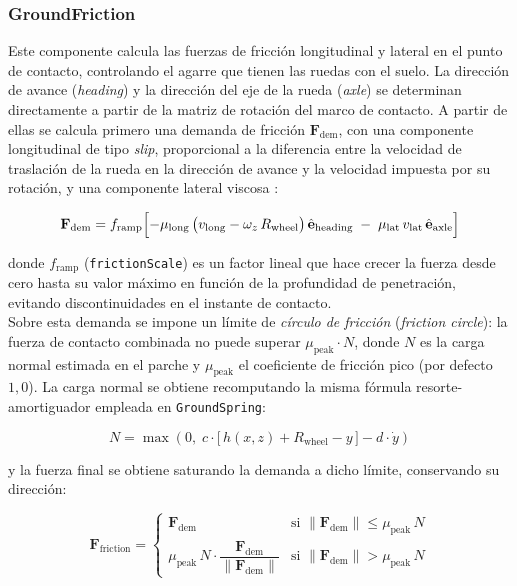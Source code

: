 \subsubsection{GroundFriction}

Este componente calcula las fuerzas de fricción longitudinal y lateral en el punto de contacto, controlando el agarre que tienen las ruedas con el suelo. La dirección de avance (\textit{heading}) y la dirección del eje de la rueda (\textit{axle}) se determinan directamente a partir de la matriz de rotación del marco de contacto. A partir de ellas se calcula primero una demanda de fricción $\mathbf{F}_\text{dem}$, con una componente longitudinal de tipo \textit{slip}, proporcional a la diferencia entre la velocidad de traslación de la rueda en la dirección de avance y la velocidad  impuesta por su rotación, y una componente lateral viscosa :

\begin{equation}
    \mathbf{F}_\text{dem} = f_\text{ramp} \Bigl[ -\mu_\text{long}\,\bigl(v_\text{long} - \omega_z\, R_\text{wheel}\bigr)\, \hat{\mathbf{e}}_\text{heading} \;-\; \mu_\text{lat}\, v_\text{lat}\, \hat{\mathbf{e}}_\text{axle} \Bigr]
\end{equation}

donde $f_\text{ramp}$ (\verb|frictionScale|) es un factor lineal que hace crecer la fuerza desde cero hasta su valor máximo en función de la profundidad de penetración, evitando discontinuidades en el instante de contacto.\\

Sobre esta demanda se impone un límite de \textit{círculo de fricción} (\textit{friction circle}): la fuerza de contacto combinada no puede superar $\mu_\text{peak} \cdot N$, donde $N$ es la carga normal estimada en el parche y $\mu_\text{peak}$ el coeficiente de fricción pico (por defecto $1{,}0$). La carga normal se obtiene recomputando la misma fórmula resorte-amortiguador empleada en \verb|GroundSpring|:

\begin{equation}
    N = \max\!\left(0,\; c \cdot \bigl[\,h(x, z) + R_\text{wheel} - y\,\bigr] - d \cdot \dot{y}\right)
\end{equation}

y la fuerza final se obtiene saturando la demanda a dicho límite, conservando su dirección:

\begin{equation}
    \mathbf{F}_\text{friction} =
    \begin{cases}
        \mathbf{F}_\text{dem} & \text{si } \|\mathbf{F}_\text{dem}\| \le \mu_\text{peak}\, N \\[6pt]
        \mu_\text{peak}\, N \cdot \dfrac{\mathbf{F}_\text{dem}}{\|\mathbf{F}_\text{dem}\|} & \text{si } \|\mathbf{F}_\text{dem}\| > \mu_\text{peak}\, N
    \end{cases}
\end{equation}

